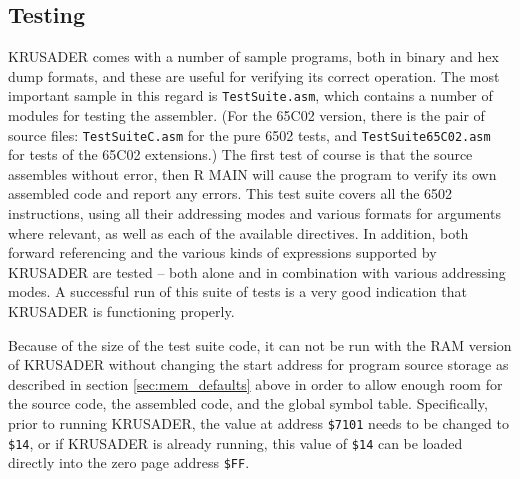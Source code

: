 \documentclass[12pt]{article}
\newcommand{\replica}[1]{\textsf{#1}}
\newcommand{\krusader}{\textsf{KRUSADER}\xspace}
\begin{document}
\subsection{Testing}

\krusader comes with a number of sample programs, both in binary and hex dump formats,
and these are useful for verifying its correct operation.  The most important sample in this regard
is \texttt{TestSuite.asm}, which contains a number of modules for testing the
assembler.  (For the 65C02 version, there is the pair of source files:
\texttt{TestSuiteC.asm} for the pure 6502 tests, and \texttt{TestSuite65C02.asm} for tests of the 65C02 extensions.)
The first test of course is that the source assembles without error, 
then \replica{R MAIN} will cause the program to verify its own assembled code and report any errors.
This test suite covers all the 6502 instructions, using all their addressing 
modes and various formats for arguments where relevant, as well as 
each of the available directives.  
In addition, both forward referencing and the various kinds of expressions 
supported by \krusader are tested -- both alone and in combination with various addressing modes.  A successful run of this suite of tests is a very good indication that \krusader
is functioning properly.

Because of the size of the test suite code, it can not be run with the RAM version
of \krusader without changing the start address for program source storage as
described in section \ref{sec:mem_defaults} above in order
to allow enough room for the source code, the assembled code, and the global symbol table.
Specifically, prior to running \krusader, the value at address \texttt{\$7101} needs to be changed to \texttt{\$14}, or if \krusader is already running, this value of \texttt{\$14} 
can be loaded directly into the zero page address \texttt{\$FF}.


\end{document}
